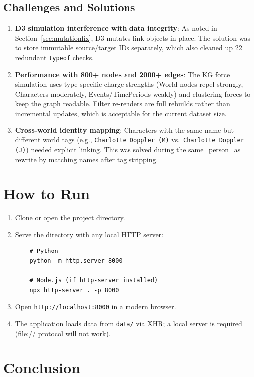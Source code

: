 \documentclass[11pt,a4paper]{article}
\begin{document}
\subsection{Challenges and Solutions}
\begin{enumerate}[nosep]
    \item \textbf{D3 simulation interference with data integrity}: As noted in Section~\ref{sec:mutationfix}, D3 mutates link objects in-place. The solution was to store immutable source/target IDs separately, which also cleaned up 22 redundant \texttt{typeof} checks.
    \item \textbf{Performance with 800+ nodes and 2000+ edges}: The KG force simulation uses type-specific charge strengths (World nodes repel strongly, Characters moderately, Events\-/Time\-Periods weakly) and clustering forces to keep the graph readable. Filter re-renders are full rebuilds rather than incremental updates, which is acceptable for the current dataset size.
    \item \textbf{Cross-world identity mapping}: Characters with the same name but different world tags (e.g., \texttt{Charlotte Doppler (M)} vs.\ \texttt{Charlotte Doppler (J)}) needed explicit linking. This was solved during the same\_person\_as rewrite by matching names after tag stripping.
\end{enumerate}

\section{How to Run}

\begin{enumerate}[nosep]
    \item Clone or open the project directory.
    \item Serve the directory with any local HTTP server:
    \begin{lstlisting}
    # Python
    python -m http.server 8000

    # Node.js (if http-server installed)
    npx http-server . -p 8000
    \end{lstlisting}
    \item Open \texttt{http://localhost:8000} in a modern browser.
    \item The application loads data from \texttt{data/} via XHR; a local server is required (file:// protocol will not work).
\end{enumerate}

\section{Conclusion}
\end{document}
